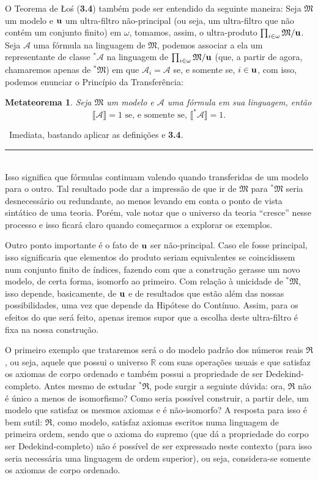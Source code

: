 \documentclass[11pt,a4paper]{article}
\newtheorem{mthrm}[mydef]{Metateorema}
\def\dem{\par\smallbreak\noindent {\textit{ Demonstração:}} \ }
\def\eop{\hfill\rule{2.5mm}{2.5mm} \\ }
\theoremstyle{definition}
\begin{document}
O Teorema de Łoś (\textbf{3.4}) também pode ser entendido da seguinte maneira: Seja $\mathfrak{M}$ um modelo e $\bf{u}$ um ultra-filtro não-principal (ou seja, um ultra-filtro que não contém um conjunto finito) em $\omega$, tomamos, assim, o ultra-produto $\prod_{i\in \omega} \mathfrak{M} / \bf{u}$. Seja $\mathscr{A}$ uma fórmula na linguagem de $\mathfrak{M}$, podemos associar a ela um representante de classe $^*\mathscr{A}$ na linguagem de $\prod_{i\in \omega} \mathfrak{M} / \bf{u}$ (que, a partir de agora, chamaremos apenas de $^*\mathfrak{M}$) em que $\mathscr{A}_i=\mathscr{A}$ se, e somente se, $i\in \bf{u}$, com isso, podemos enunciar o Princípio da Transferência: 

\begin{mthrm}
	
	Seja $\mathfrak{M}$ um modelo e $\mathscr{A}$ uma fórmula em sua linguagem, então $$ \llbracket\mathscr{A}  \rrbracket = 1 \text{ se, e somente se, }  \llbracket ^*\mathscr{A}  \rrbracket = 1.$$
	
\end{mthrm}

\dem Imediata, bastando aplicar as definições e \textbf{3.4}. \eop

Isso significa que fórmulas continuam valendo quando transferidas de um modelo para o outro. Tal resultado pode dar a impressão de que ir de $\mathfrak{M}$ para $^*\mathfrak{M}$ seria desnecessário ou redundante, ao menos levando em conta o ponto de vista sintático de uma teoria. Porém, vale notar que o universo da teoria ``cresce'' nesse processo e isso ficará claro quando começarmos a explorar os exemplos. 

Outro ponto importante é o fato de $\bf{u}$ ser não-principal. Caso ele fosse principal, isso significaria que elementos do produto seriam equivalentes se coincidissem num conjunto finito de índices, fazendo com que a construção gerasse um novo modelo, de certa forma, isomorfo ao primeiro. Com relação à unicidade de $^*\mathfrak{M}$, isso depende, basicamente, de $\bf{u}$ e de resultados que estão além das nossas possibilidades, uma vez que depende da Hipótese do Contínuo. Assim, para os efeitos do que será feito, apenas iremos supor que a escolha deste ultra-filtro é fixa na nossa construção.      

O primeiro exemplo que trataremos será o do modelo padrão dos números reais $\mathfrak{R}$, ou seja, aquele que possui o universo $\mathbb{R}$ com suas operações usuais e que satisfaz os axiomas de corpo ordenado e também possui a propriedade de ser Dedekind-completo. Antes mesmo de estudar $^*\mathfrak{R}$, pode surgir a seguinte dúvida: ora, $\mathfrak{R}$ não é único a menos de isomorfismo? Como seria possível construir, a partir dele, um modelo que satisfaz os mesmos axiomas e é não-isomorfo? A resposta para isso é bem sutil: $\mathfrak{R}$, como modelo, satisfaz axiomas escritos numa linguagem de primeira ordem, sendo que o axioma do supremo (que dá a propriedade do corpo ser Dedekind-completo) não é possível de ser expressado neste contexto (para isso seria necessária uma linguagem de ordem superior), ou seja, considera-se somente os axiomas de corpo ordenado. 
\end{document}
